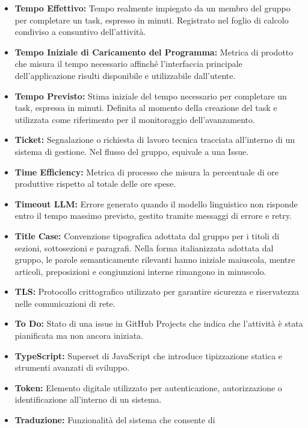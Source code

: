 \begin{itemize}[leftmargin=*]
      \item \textbf{Tempo Effettivo:} Tempo realmente impiegato da un membro del
            gruppo per completare un task, espresso in minuti. Registrato nel foglio
            di calcolo condiviso a consuntivo dell'attività.
      \item \textbf{Tempo Iniziale di Caricamento del Programma:} Metrica di prodotto
      che misura il tempo necessario affinché l'interfaccia principale dell'applicazione
      risulti disponibile e utilizzabile dall'utente.
            \item \textbf{Tempo Previsto:} Stima iniziale del tempo necessario per
            completare un task, espressa in minuti. Definita al momento della
            creazione del task e utilizzata come riferimento per il monitoraggio
            dell'avanzamento.
      \item \textbf{Ticket:} Segnalazione o richiesta di lavoro tecnica tracciata all'interno di un sistema di gestione. Nel flusso del gruppo, equivale a una Issue.
      \item \textbf{Time Efficiency:} Metrica di processo che misura la percentuale di
      ore produttive rispetto al totale delle ore spese.
      \item \textbf{Timeout LLM:} Errore generato quando il modello linguistico non risponde entro il tempo massimo previsto, gestito tramite messaggi di errore e retry.
      \item \textbf{Title Case:} Convenzione tipografica adottata dal gruppo per i
            titoli di sezioni, sottosezioni e paragrafi. Nella forma italianizzata adottata
            dal gruppo, le parole semanticamente rilevanti hanno iniziale maiuscola, mentre
            articoli, preposizioni e congiunzioni interne rimangono in minuscolo.
      \item \textbf{TLS:} Protocollo crittografico utilizzato per garantire sicurezza e riservatezza nelle comunicazioni di rete.
      \item \textbf{To Do:} Stato di una issue in GitHub Projects che indica che l'attività è stata pianificata ma non ancora iniziata.
      \item \textbf{TypeScript:} Superset di JavaScript che introduce tipizzazione statica e strumenti avanzati di sviluppo.
      \item \textbf{Token:} Elemento digitale utilizzato per autenticazione, autorizzazione o identificazione all’interno di un sistema.
      \item \textbf{Traduzione:} Funzionalità del sistema che consente di

\end{itemize}
